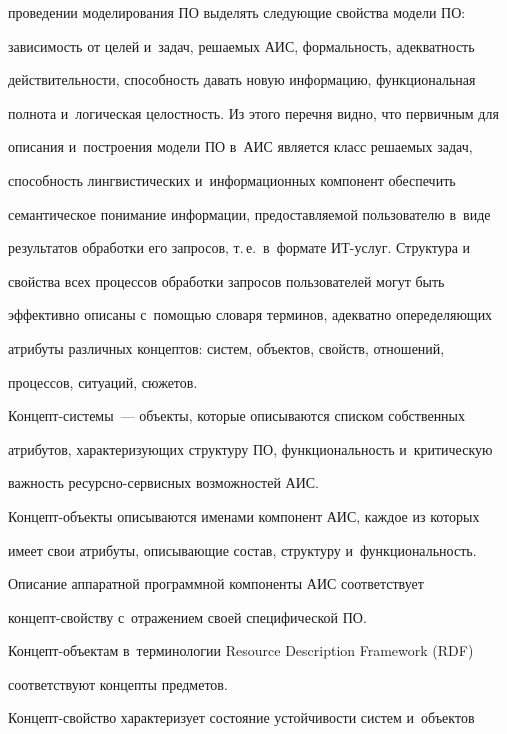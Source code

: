 проведении моделирования ПО выделять следующие свойства модели ПО: 


зависимость от целей и~задач, решаемых АИС, формальность, адекватность 


действительности, способность давать новую информацию, функциональная 


полнота и~логическая целостность. Из этого перечня видно, что первичным для 


описания и~построения модели ПО в~АИС является класс решаемых задач, 


способность лингвистических и~информационных компонент обеспечить 


семантическое понимание информации, предоставляемой пользователю в~виде 


результатов обработки его запросов, т.\,е.\ в~формате ИТ-услуг. Структура и~


свойства всех процессов обработки запросов пользователей могут быть 


эффективно описаны с~помощью словаря терминов, адекватно опеределяющих 


атрибуты различных концептов: систем, объектов, свойств, отношений, 


процессов, ситуаций, сюжетов. 


  


  Концепт-системы~--- объекты, которые описываются списком собственных 


атрибутов, характеризующих структуру ПО, функциональность и~критическую 


важность ресурсно-сервисных возможностей АИС. 


  


  Концепт-объекты описываются именами компонент АИС, каждое из которых 


имеет свои атрибуты, описывающие состав, структуру и~функциональность. 


Описание аппаратной программной компоненты АИС соответствует  


кон\-цепт-свой\-ст\-ву с~отражением своей специфической ПО.  


Кон\-цепт-объ\-ек\-там в~терминологии Resource Description Framework (RDF) 


соответствуют концепты предметов. 


  


  Концепт-свойство характеризует состояние устойчивости систем и~объектов 


